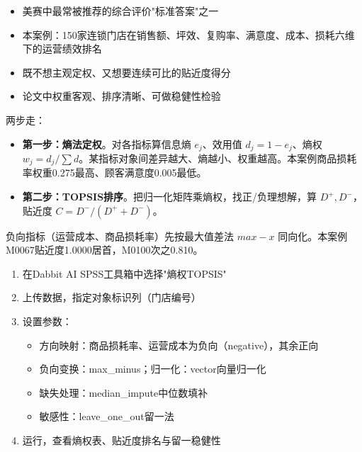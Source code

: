 \begin{algoscene}
\begin{itemize}
    \item 美赛中最常被推荐的综合评价"标准答案"之一
    \item 本案例：150家连锁门店在销售额、坪效、复购率、满意度、成本、损耗六维下的运营绩效排名
    \item 既不想主观定权、又想要连续可比的贴近度得分
    \item 论文中权重客观、排序清晰、可做稳健性检验
\end{itemize}
\end{algoscene}

\begin{algoprinciple}
两步走：

\begin{itemize}
    \item \textbf{第一步：熵法定权}。对各指标算信息熵 $e_j$、效用值 $d_j=1-e_j$、熵权 $w_j=d_j/\sum d$。某指标对象间差异越大、熵越小、权重越高。本案例商品损耗率权重0.275最高、顾客满意度0.005最低。
    \item \textbf{第二步：TOPSIS排序}。把归一化矩阵乘熵权，找正/负理想解，算 $D^+,D^-$，贴近度 $C=D^-/(D^++D^-)$。
\end{itemize}

负向指标（运营成本、商品损耗率）先按最大值差法 $max-x$ 同向化。本案例M0067贴近度1.0000居首，M0100次之0.810。
\end{algoprinciple}

\begin{algosposs}
\begin{enumerate}
    \item 在Dabbit AI SPSS工具箱中选择"熵权TOPSIS"
    \item 上传数据，指定对象标识列（门店编号）
    \item 设置参数：
    \begin{itemize}
        \item 方向映射：商品损耗率、运营成本为负向（negative），其余正向
        \item 负向变换：max\_minus；归一化：vector向量归一化
        \item 缺失处理：median\_impute中位数填补
        \item 敏感性：leave\_one\_out留一法
    \end{itemize}
    \item 运行，查看熵权表、贴近度排名与留一稳健性
\end{enumerate}
\end{algosposs}

